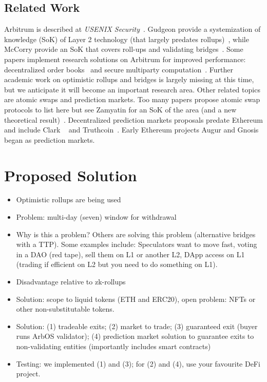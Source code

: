 \subsection{Related Work} 

Arbitrum is described at \textit{USENIX Security}~\cite{kalodner2018arbitrum}. Gudgeon \etal provide a systemization of knowledge (SoK) of Layer 2 technology (that largely predates rollups)~\cite{gudgeon2019sok}, while McCorry \etal provide an SoK that covers roll-ups and validating bridges~\cite{mccorry2021sok}. Some papers implement research solutions on Arbitrum for improved performance:  decentralized order books~\cite{moosavi2021lissy} and secure multiparty computation~\cite{demirag2021absentia}. Further academic work on optimistic rollups and bridges is largely missing at this time, but we anticipate it will become an important research area.  Other related topics are atomic swaps and prediction markets. Too many papers propose atomic swap protocols to list here but see Zamyatin \etal for an SoK of the area (and a new theoretical result)~\cite{zamyatin2021sok}. Decentralized prediction markets proposals predate Ethereum and include Clark \etal~\cite{clark2014decentralizing} and Truthcoin~\cite{sztorc2015truthcoin}. Early Ethereum projects Augur and Gnosis began as prediction markets. 


\section{Proposed Solution} 



\begin{itemize}
\item Optimistic rollups are being used
\item Problem: multi-day (\eg seven) window for withdrawal
\item Why is this a problem? Others are solving this problem (alternative bridges with a TTP). Some examples include: Speculators want to move fast, voting in a DAO (red tape), sell them on L1 or another L2, DApp access on L1 (trading if efficient on L2 but you need to do something on L1). 
\item Disadvantage relative to zk-rollups
\item Solution: scope to liquid tokens (ETH and ERC20), open problem: NFTs or other non-substitutable tokens. 
\item Solution: (1) tradeable exits; (2) market to trade; (3) guaranteed exit (buyer runs ArbOS validator); (4) prediction market solution to guarantee exits to non-validating entities (importantly includes smart contracts)
\item Testing: we implemented (1) and (3); for (2) and (4), use your favourite DeFi project.
\end{itemize}


